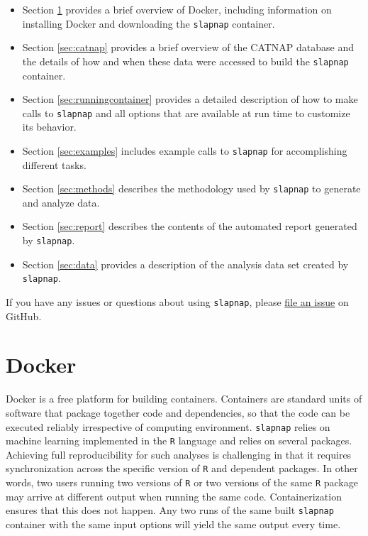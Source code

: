\documentclass[
]{article}
\providecommand{\tightlist}{%
  \setlength{\itemsep}{0pt}\setlength{\parskip}{0pt}}
\begin{document}
\begin{itemize}
\tightlist
\item
  Section \ref{sec:docker} provides a brief overview of Docker, including information on installing Docker and downloading the \texttt{slapnap} container.
\item
  Section \ref{sec:catnap} provides a brief overview of the CATNAP database and the details of how and when these data were accessed to build the \texttt{slapnap} container.
\item
  Section \ref{sec:runningcontainer} provides a detailed description of how to make calls to \texttt{slapnap} and all options that are available at run time to customize its behavior.
\item
  Section \ref{sec:examples} includes example calls to \texttt{slapnap} for accomplishing different tasks.
\item
  Section \ref{sec:methods} describes the methodology used by \texttt{slapnap} to generate and analyze data.
\item
  Section \ref{sec:report} describes the contents of the automated report generated by \texttt{slapnap}.
\item
  Section \ref{sec:data} provides a description of the analysis data set created by \texttt{slapnap}.
\end{itemize}

If you have any issues or questions about using \texttt{slapnap}, please \href{https://github.com/benkeser/slapnap/issues}{file an issue} on GitHub.

\hypertarget{sec:docker}{%
\section{Docker}\label{sec:docker}}

Docker is a free platform for building containers. Containers are standard units of software that package together code and dependencies, so that the code can be executed reliably irrespective of computing environment. \texttt{slapnap} relies on machine learning implemented in the \texttt{R} language and relies on several packages. Achieving full reproducibility for such analyses is challenging in that it requires synchronization across the specific version of \texttt{R} and dependent packages. In other words, two users running two versions of \texttt{R} or two versions of the same \texttt{R} package may arrive at different output when running the same code. Containerization ensures that this does not happen. Any two runs of the same built \texttt{slapnap} container with the same input options will yield the same output every time.
\end{document}
